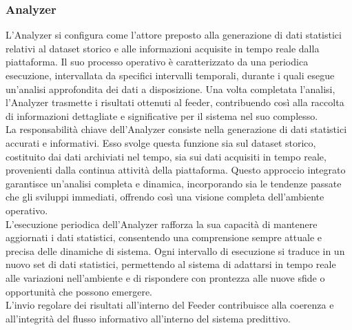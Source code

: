 \subsubsection[Analyzer]{Analyzer}
L'Analyzer si configura come l'attore preposto alla generazione di dati statistici relativi al dataset storico e alle informazioni acquisite in tempo reale dalla piattaforma.
Il suo processo operativo è caratterizzato da una periodica esecuzione, intervallata da specifici intervalli temporali, durante i quali esegue un'analisi approfondita dei dati a disposizione.
Una volta completata l'analisi, l'Analyzer trasmette i risultati ottenuti al feeder, contribuendo così alla raccolta di informazioni dettagliate e significative per il sistema nel suo complesso. \\
La responsabilità chiave dell'Analyzer consiste nella generazione di dati statistici accurati e informativi.
Esso svolge questa funzione sia sul dataset storico, costituito dai dati archiviati nel tempo, sia sui dati acquisiti in tempo reale, provenienti dalla continua attività della piattaforma.
Questo approccio integrato garantisce un'analisi completa e dinamica, incorporando sia le tendenze passate che gli sviluppi immediati, offrendo così una visione completa dell'ambiente operativo. \\
L'esecuzione periodica dell'Analyzer rafforza la sua capacità di mantenere aggiornati i dati statistici, consentendo una comprensione sempre attuale e precisa delle dinamiche di sistema.
Ogni intervallo di esecuzione si traduce in un nuovo set di dati statistici, permettendo al sistema di adattarsi in tempo reale alle variazioni nell'ambiente e di rispondere con prontezza alle nuove sfide o opportunità che possono emergere. \\
L'invio regolare dei risultati all'interno del Feeder contribuisce alla coerenza e all'integrità del flusso informativo all'interno del sistema predittivo.

